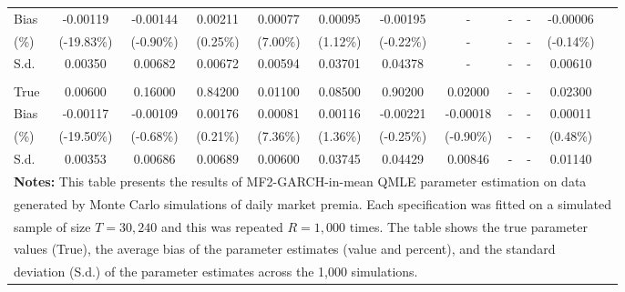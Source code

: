 \documentclass[12pt]{article}
\begin{document}
\begin{table}[!ht]
{\begin{tabular}{lccccccccccc}
      Bias & -0.00119 & -0.00144 & 0.00211 & 0.00077 & 0.00095 & -0.00195 & - & - & - & -0.00006\\
      (\%)  & (-19.83\%) & (-0.90\%) & (0.25\%) & (7.00\%) & (1.12\%) & (-0.22\%) & - & - & - & (-0.14\%)\\
      S.d.  & 0.00350 & 0.00682 & 0.00672 & 0.00594 & 0.03701 & 0.04378 & - & - & - & 0.00610\\
      \addlinespace
      \multicolumn{12}{l}{\textbf{Non-Proportional}}\\
      True & 0.00600 & 0.16000 & 0.84200 & 0.01100 & 0.08500 & 0.90200 & 0.02000 & - & - & 0.02300\\
      Bias & -0.00117 & -0.00109 & 0.00176 & 0.00081 & 0.00116 & -0.00221 & -0.00018 & - & - & 0.00011\\
      (\%)  & (-19.50\%) & (-0.68\%) & (0.21\%) & (7.36\%) & (1.36\%) & (-0.25\%) & (-0.90\%) & - & - & (0.48\%)\\
      S.d.  & 0.00353 & 0.00686 & 0.00689 & 0.00600 & 0.03745 & 0.04429 & 0.00846 & - & - & 0.01140\\
      \midrule
      \multicolumn{12}{l}{\textbf{Notes:} This table presents the results of MF2-GARCH-in-mean QMLE parameter estimation on data}\\
      \multicolumn{12}{l}{generated by Monte Carlo simulations of daily market premia. Each specification was fitted on a simulated}\\
      \multicolumn{12}{l}{sample of size $T=30,240$ and this was repeated $R=1,000$ times. The table shows the true parameter}\\
      \multicolumn{12}{l}{values (True), the average bias of the parameter estimates (value and percent), and the standard}\\
      \multicolumn{12}{l}{deviation (S.d.) of the parameter estimates across the 1,000 simulations.}\\
      \bottomrule
    \end{tabular}%
  }
\end{table}
\end{document}
